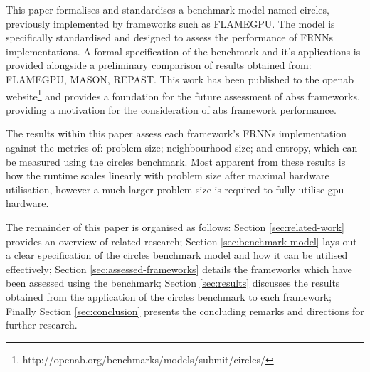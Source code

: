   This paper formalises and standardises a benchmark model named circles, previously implemented by frameworks such as FLAMEGPU\cite{RR082}. The model is specifically standardised and designed to assess the performance of FRNNs implementations. A formal specification of the benchmark and it's applications is provided alongside a preliminary comparison of results obtained from: FLAMEGPU, MASON, REPAST. This work has been published to the \gls{openab} website\footnote{http://openab.org/benchmarks/models/submit/circles/} and provides a foundation for the future assessment of \glspl{abs} frameworks, providing a motivation for the consideration of \gls{abs} framework performance.
  
  The results within this paper assess each framework’s FRNNs implementation against the metrics of: problem size; neighbourhood size; and entropy, which can be measured using the circles benchmark. Most apparent from these results is how the runtime scales linearly with problem size after maximal hardware utilisation, however a much larger problem size is required to fully utilise \gls{gpu} hardware.
  
  The remainder of this paper is organised as follows: Section \ref{sec:related-work} provides an overview of related research; Section \ref{sec:benchmark-model} lays out a clear specification of the circles benchmark model and how it can be utilised effectively; Section \ref{sec:assessed-frameworks} details the frameworks which have been assessed using the benchmark; Section \ref{sec:results} discusses the results obtained from the application of the circles benchmark to each framework; Finally Section \ref{sec:conclusion} presents the concluding remarks and directions for further research.